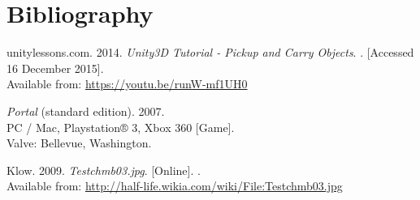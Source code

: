 \section{Bibliography}
\begin{thebibliography}{widestlabel}
	unitylessons.com. 2014. \textit{Unity3D Tutorial - Pickup and Carry Objects}.
	\newline
	[Online]. [Accessed 16 December 2015].\\
	Available from: \url{https://youtu.be/runW-mf1UH0}
	
	\textit{Portal} (standard edition). 2007.\\
	PC / Mac, Playstation® 3, Xbox 360 [Game].\\
	Valve: Bellevue, Washington.
	
	Klow. 2009. \textit{Testchmb03.jpg}. [Online].
	.\\
	Available from: \url{http://half-life.wikia.com/wiki/File:Testchmb03.jpg}
\end{thebibliography}

